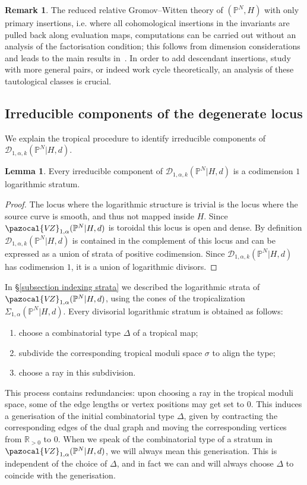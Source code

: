 \documentclass[11pt]{amsart}
\newcommand{\PP}{\mathbb P}
\newcommand{\VZ}{\pazocal{V\!Z}}
\newcommand{\Dcal}{\mathcal{D}}
\newcommand{\RR}{\mathbb{R}}
\theoremstyle{definition}
\newtheorem{lemma}[thm]{Lemma}
\theoremstyle{definition}
\newtheorem{remark}[thm]{Remark}
\begin{document}
\begin{remark}
The reduced relative Gromov--Witten theory of $(\mathbb P^N,H)$ with only primary insertions, i.e. where all cohomological insertions in the invariants are pulled back along evaluation maps, computations can be carried out without an analysis of the factorisation condition; this follows from dimension considerations and leads to the main results in~\cite{Vre}. In order to add descendant insertions, study with more general pairs, or indeed work cycle theoretically, an analysis of these tautological classes is crucial. 
\end{remark}

\subsection{Irreducible components of the degenerate locus} We explain the tropical procedure to identify irreducible components of $\Dcal_{1,\alpha,k}(\PP^N|H,d)$.

\begin{lemma} \label{Lemma components are logarithmic divisors} Every irreducible component of $\Dcal_{1,\alpha,k}(\PP^N|H,d)$ is a codimension $1$ logarithmic stratum.\end{lemma}

\begin{proof} The locus where the logarithmic structure is trivial is the  locus where the source curve is smooth, and thus not mapped inside $H$. Since $\VZ_{1,\alpha}(\PP^N|H,d)$ is toroidal this locus is open and dense. By definition $\Dcal_{1,\alpha,k}(\PP^N|H,d)$ is contained in the  complement of this locus and can be expressed as a union of strata of positive codimension. Since $\Dcal_{1,\alpha,k}(\PP^N|H,d)$ has codimension $1$, it is a union of logarithmic divisors.\end{proof}

In \S \ref{subsection indexing strata} we described the logarithmic strata of $\VZ_{1,\alpha}(\PP^N|H,d)$, using the cones of the tropicalization $\Sigma_{1,\alpha}(\PP^N|H,d)$. Every divisorial logarithmic stratum is obtained as follows:
\begin{enumerate}
\item choose a combinatorial type $\Delta$ of a tropical map;
\item subdivide the corresponding tropical moduli space $\sigma$ to align the type;
\item choose a ray in this subdivision.
\end{enumerate}
This process contains redundancies: upon choosing a ray in the tropical moduli space, some of the edge lengths or vertex positions may get set to $0$. This induces a generisation of the initial combinatorial type $\Delta$, given by contracting the corresponding edges of the dual graph and moving the corresponding vertices from $\RR_{>0}$ to $0$. When we speak of the combinatorial type of a stratum in $\VZ_{1,\alpha}(\PP^N|H,d)$, we will always mean this generisation. This is independent of the choice of $\Delta$, and in fact we can and will always choose $\Delta$ to coincide with the generisation.
\end{document}
